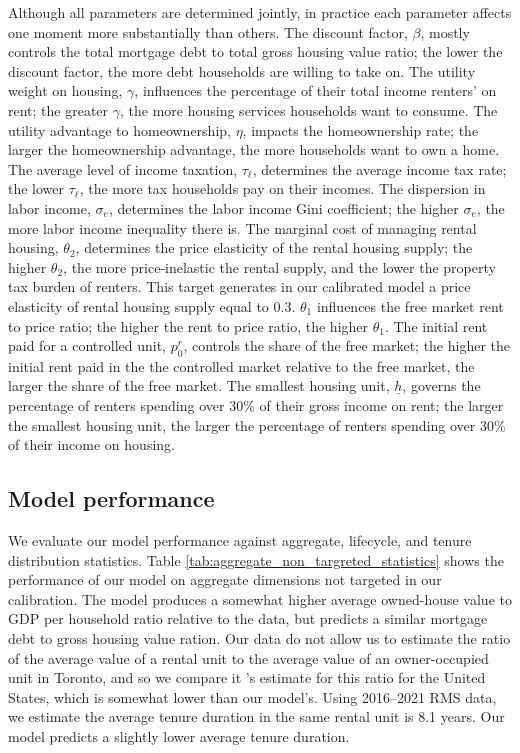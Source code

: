 \documentclass[parskip=full]{article}
\begin{document}
Although all parameters are determined jointly, in practice each parameter affects one moment more substantially than others. The discount factor, $\beta$, mostly controls the total mortgage debt to total gross housing value ratio; the lower the discount factor, the more debt households are willing to take on. The utility weight on housing, $\gamma$, influences the percentage of their total income renters' on rent; the greater $\gamma$, the more housing services households want to consume. The utility advantage to homeownership, $\eta$, impacts the homeownership rate; the larger the homeownership advantage, the more households want to own a home. The average level of income taxation, $\tau_{\ell}$, determines the average income tax rate; the lower $\tau_{\ell}$, the more tax households pay on their incomes. The dispersion in labor income, $\sigma_{e}$, determines the labor income Gini coefficient; the higher $\sigma_{e}$, the more labor income inequality there is. The marginal cost of managing rental housing, $\theta_{2}$, determines the price elasticity of the rental housing supply; the higher $\theta_{2}$, the more price-inelastic the rental supply, and the lower the property tax burden of renters. This target generates in our calibrated model a price elasticity of rental housing supply equal to 0.3. $\theta_{1}$ influences the free market rent to price ratio; the higher the rent to price ratio, the higher $\theta_{1}$. The initial rent paid for a controlled unit, $p^{r}_{0}$, controls the share of the free market; the higher the initial rent paid in the the controlled market relative to the free market, the larger the share of the free market. The smallest housing unit, $\underline{h}$, governs the percentage of renters spending over 30\% of their gross income on rent; the larger the smallest housing unit, the larger the percentage of renters spending over 30\% of their income on housing. 

\subsection{Model performance}\label{subsection:non_targeted_statistics}

We evaluate our model performance against aggregate, lifecycle, and tenure distribution statistics. Table \ref{tab:aggregate_non_targreted_statistics} shows the performance of our model on aggregate dimensions not targeted in our calibration. The model produces a somewhat higher average owned-house value to GDP per household ratio relative to the data, but predicts a similar mortgage debt to gross housing value ration. Our data do not allow us to estimate the ratio of the average value of a rental unit to the average value of an owner-occupied unit in Toronto, and so we compare it \citet{chatterjee-eyigungor-2015}'s estimate for this ratio for the United States, which is somewhat lower than our model's. Using 2016--2021 RMS data, we estimate the average tenure duration in the same rental unit is 8.1 years. Our model predicts a slightly lower average tenure duration. 
\end{document}
